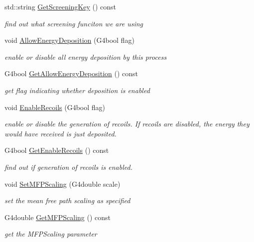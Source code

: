 \begin{DoxyCompactItemize}
std\+::string \hyperlink{classG4ScreenedNuclearRecoil_a0d49c385b785d8b883e6b165ec4f34bc}{Get\+Screening\+Key} () const 
\begin{DoxyCompactList}\small\item\em find out what screening funciton we are using \end{DoxyCompactList}\item 
void \hyperlink{classG4ScreenedNuclearRecoil_ace84b594276d0b2b44350c1de6bfdb9e}{Allow\+Energy\+Deposition} (G4bool flag)
\begin{DoxyCompactList}\small\item\em enable or disable all energy deposition by this process \end{DoxyCompactList}\item 
G4bool \hyperlink{classG4ScreenedNuclearRecoil_abac8f36bad05cdcc18e309d6e7f4f627}{Get\+Allow\+Energy\+Deposition} () const 
\begin{DoxyCompactList}\small\item\em get flag indicating whether deposition is enabled \end{DoxyCompactList}\item 
void \hyperlink{classG4ScreenedNuclearRecoil_ab99bd0156eee60815ddba434a2bb9b0b}{Enable\+Recoils} (G4bool flag)
\begin{DoxyCompactList}\small\item\em enable or disable the generation of recoils. If recoils are disabled, the energy they would have received is just deposited. \end{DoxyCompactList}\item 
G4bool \hyperlink{classG4ScreenedNuclearRecoil_a4a4569aed4465249a0aa17f842e7ec01}{Get\+Enable\+Recoils} () const 
\begin{DoxyCompactList}\small\item\em find out if generation of recoils is enabled. \end{DoxyCompactList}\item 
void \hyperlink{classG4ScreenedNuclearRecoil_afb077516aea7a307c456a9455368ed5f}{Set\+M\+F\+P\+Scaling} (G4double scale)
\begin{DoxyCompactList}\small\item\em set the mean free path scaling as specified \end{DoxyCompactList}\item 
G4double \hyperlink{classG4ScreenedNuclearRecoil_a6e1a160fe83222c2bc7c9a5428cf4e50}{Get\+M\+F\+P\+Scaling} () const 
\begin{DoxyCompactList}\small\item\em get the M\+F\+P\+Scaling parameter \end{DoxyCompactList}\item 

\end{DoxyCompactItemize}
